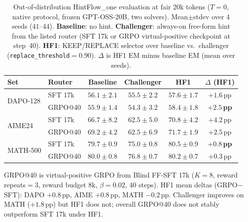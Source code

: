 \begin{table}[t]
\centering
\small
\setlength{\tabcolsep}{3.5pt}
\caption{Out-of-distribution HintFlow\_one evaluation at fair 20k tokens
($T{=}0$, native protocol, frozen GPT-OSS-20B, two solvers).
Mean$\pm$stdev over 4 seeds ($41$--$44$).
\textbf{Baseline}: no hint.
\textbf{Challenger}: always-on free-form hint from the listed router
(SFT 17k or GRPO virtual-positive checkpoint at step~40).
\textbf{HF1}: KEEP/REPLACE selector over baseline vs.\ challenger
(\texttt{replace\_threshold}${=}0.90$).
$\Delta$ is HF1 EM minus baseline EM (mean over seeds).}
\label{tab:ood-sft17k-vs-grpo40-r4}
\begin{tabular}{llcccc}
\toprule
\textbf{Set}
  & \textbf{Router}
  & \textbf{Baseline}
  & \textbf{Challenger}
  & \textbf{HF1}
  & \textbf{$\Delta$ (HF1)} \\
\midrule
\multirow{2}{*}{DAPO-128}
  & SFT 17k
  & $56.1{\pm}2.1$
  & $55.5{\pm}2.2$
  & $57.6{\pm}1.7$
  & \textcolor{green!60!black}{$+1.6$\,pp} \\
  & GRPO@40
  & $55.9{\pm}1.4$
  & $54.3{\pm}3.2$
  & \textbf{$58.4{\pm}1.8$}
  & \textcolor{green!60!black}{\textbf{$+2.5$\,pp}} \\
\midrule
\multirow{2}{*}{AIME24}
  & SFT 17k
  & $66.7{\pm}8.2$
  & $62.5{\pm}5.0$
  & $70.8{\pm}4.2$
  & \textcolor{green!60!black}{$+4.2$\,pp} \\
  & GRPO@40
  & $69.2{\pm}4.2$
  & $62.5{\pm}6.9$
  & \textbf{$71.7{\pm}1.9$}
  & \textcolor{green!60!black}{$+2.5$\,pp} \\
\midrule
\multirow{2}{*}{MATH-500}
  & SFT 17k
  & $79.7{\pm}0.9$
  & $75.0{\pm}0.8$
  & \textbf{$80.5{\pm}0.9$}
  & \textcolor{green!60!black}{\textbf{$+0.8$\,pp}} \\
  & GRPO@40
  & $80.0{\pm}0.8$
  & $76.8{\pm}0.7$
  & $80.2{\pm}0.7$
  & \textcolor{green!60!black}{$+0.3$\,pp} \\
\bottomrule
\end{tabular}

\vspace{0.25em}
{\scriptsize
GRPO@40 is virtual-positive GRPO from Blind FF-SFT 17k
($K{=}8$, reward repeats${=}3$, reward budget 8k, $\beta{=}0.02$, 40 steps).
HF1 mean deltas (GRPO$-$SFT): DAPO $+0.8$\,pp, AIME $+0.8$\,pp, MATH $-0.2$\,pp.
Challenger improves on MATH ($+1.8$\,pp) but HF1 does not; overall GRPO@40
does not stably outperform SFT 17k under HF1.
}
\end{table}
